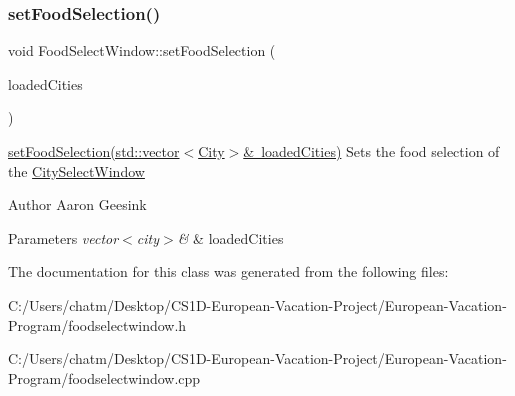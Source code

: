 \subsubsection{\texorpdfstring{setFoodSelection()}{setFoodSelection()}}
{\footnotesize\ttfamily void Food\+Select\+Window\+::set\+Food\+Selection (\begin{DoxyParamCaption}\item[{std\+::vector$<$ \mbox{\hyperlink{class_city}{City}} $>$ \&}]{loaded\+Cities }\end{DoxyParamCaption})}



\mbox{\hyperlink{class_food_select_window_a6df884d5b39d16a2708f8bcae205ecd5}{set\+Food\+Selection(std\+::vector$<$\+City$>$\& loaded\+Cities)}} Sets the food selection of the \mbox{\hyperlink{class_city_select_window}{City\+Select\+Window}} 

\begin{DoxyAuthor}{Author}
Aaron Geesink 
\end{DoxyAuthor}

\begin{DoxyParams}{Parameters}
{\em vector$<$city$>$\&} & loaded\+Cities \\
\hline
\end{DoxyParams}


The documentation for this class was generated from the following files\+:\begin{DoxyCompactItemize}
\item 
C\+:/\+Users/chatm/\+Desktop/\+C\+S1\+D-\/\+European-\/\+Vacation-\/\+Project/\+European-\/\+Vacation-\/\+Program/foodselectwindow.\+h\item 
C\+:/\+Users/chatm/\+Desktop/\+C\+S1\+D-\/\+European-\/\+Vacation-\/\+Project/\+European-\/\+Vacation-\/\+Program/foodselectwindow.\+cpp\end{DoxyCompactItemize}
